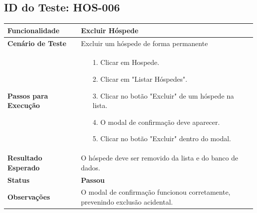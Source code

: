 \documentclass[
	12pt,				%
	openany,			%
	oneside,			%
	a4paper,			%
	english,			%
	french,				%
	spanish,			%
	brazil				%
	]{abntex2}
\begin{document}
\begin{apendicesenv}
	\subsection*{ID do Teste: HOS-006}
	\begin{tabular}{@{} p{5cm} p{11cm} @{}}
		\toprule
		\textbf{Funcionalidade} & Excluir Hóspede \\
		\midrule
		\textbf{Cenário de Teste} & Excluir um hóspede de forma permanente \\
		\midrule
		\textbf{Passos para Execução} &
		\begin{itemize} \itemsep0em 
			\item[1.] Clicar em Hospede.
			\item[2.] Clicar em "Listar Hóspedes".
			\item[3.] Clicar no botão "Excluir" de um hóspede na lista.
			\item[4.] O modal de confirmação deve aparecer.
			\item[5.] Clicar no botão "Excluir" dentro do modal.
		\end{itemize} \\
		\midrule
		\textbf{Resultado Esperado} & O hóspede deve ser removido da lista e do banco de dados. \\
		\midrule
		\textbf{Status} & \textbf{Passou} \\
		\midrule
		\textbf{Observações} & O modal de confirmação funcionou corretamente, prevenindo exclusão acidental. \\
		\bottomrule
	\end{tabular}
















\end{apendicesenv}








\printindex
\end{document}
